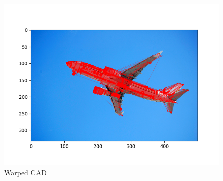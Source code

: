 \begin{figure}[H]
  \centering
  \begin{minipage}{.8\textwidth}
    \centering
    \includegraphics[width=\textwidth]{./figures/03-warped-cad.png}
    \caption*{Warped CAD}
  \end{minipage}
\end{figure}
